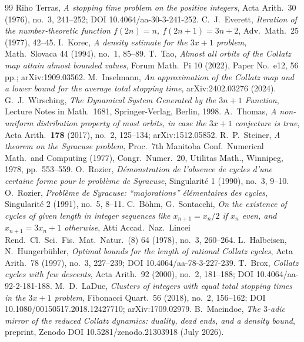 \documentclass[11pt]{article}
\theoremstyle{remark}
\begin{document}
\begin{thebibliography}{99}
\small
{} Riho Terras, \emph{A stopping time problem on the positive integers}, Acta Arith.\ 30 (1976), no.~3, 241--252; DOI 10.4064/aa-30-3-241-252.
 C.~J.~Everett, \emph{Iteration of the number-theoretic function
  $f(2n) = n$, $f(2n+1) = 3n+2$}, Adv.\ Math.\ 25 (1977), 42--45.
 I.~Korec, \emph{A density estimate for the $3x+1$ problem},
  Math.\ Slovaca 44 (1994), no.\ 1, 85--89.
 T.~Tao, \emph{Almost all orbits of the Collatz map attain almost
  bounded values}, Forum Math.\ Pi 10 (2022), Paper No.\ e12, 56 pp.;
  arXiv:1909.03562.
 M.~Inselmann, \emph{An approximation of the Collatz map and a
  lower bound for the average total stopping time}, arXiv:2402.03276 (2024).
 G.~J.~Wirsching, \emph{The Dynamical System Generated by the
  $3n+1$ Function}, Lecture Notes in Math.\ 1681, Springer-Verlag, Berlin, 1998.
 A.~Thomas, \emph{A non-uniform distribution property of most
  orbits, in case the $3x+1$ conjecture is true}, Acta Arith.\ \textbf{178}
  (2017), no.~2, 125--134; arXiv:1512.05852.
 R.~P.~Steiner, \emph{A theorem on the Syracuse problem}, Proc.\ 7th Manitoba Conf.\ Numerical Math.\ and Computing (1977), Congr.\ Numer.\ 20, Utilitas Math., Winnipeg, 1978, pp.\ 553--559.
 O.~Rozier, \emph{D\'emonstration de l'absence de cycles d'une certaine forme pour le probl\`eme de Syracuse}, Singularit\'e 1 (1990), no.~3, 9--10.
 O.~Rozier, \emph{Probl\`eme de Syracuse: ``majorations'' \'el\'ementaires des cycles}, Singularit\'e 2 (1991), no.~5, 8--11.
 C.~B\"ohm, G.~Sontacchi, \emph{On the existence of cycles of given length in integer sequences like $x_{n+1} = x_n/2$ if $x_n$ even, and $x_{n+1} = 3x_n + 1$ otherwise}, Atti Accad.\ Naz.\ Lincei Rend.\ Cl.\ Sci.\ Fis.\ Mat.\ Natur.\ (8) 64 (1978), no.~3, 260--264.
 L.~Halbeisen, N.~Hungerb\"uhler, \emph{Optimal bounds for the length of rational Collatz cycles}, Acta Arith.\ 78 (1997), no.~3, 227--239; DOI 10.4064/aa-78-3-227-239.
 T.~Brox, \emph{Collatz cycles with few descents}, Acta Arith.\ 92 (2000), no.~2, 181--188; DOI 10.4064/aa-92-2-181-188.
 M.~D.~LaDue, \emph{Clusters of integers with equal total stopping times in the $3x+1$ problem}, Fibonacci Quart.\ 56 (2018), no.~2, 156--162; DOI 10.1080/00150517.2018.12427710; arXiv:1709.02979.
 B.~Macindoe, \emph{The $3$-adic mirror of the reduced Collatz dynamics: duality, dead ends, and a density bound}, preprint, Zenodo DOI 10.5281/zenodo.21303918 (July 2026).

\end{thebibliography}
\end{document}

